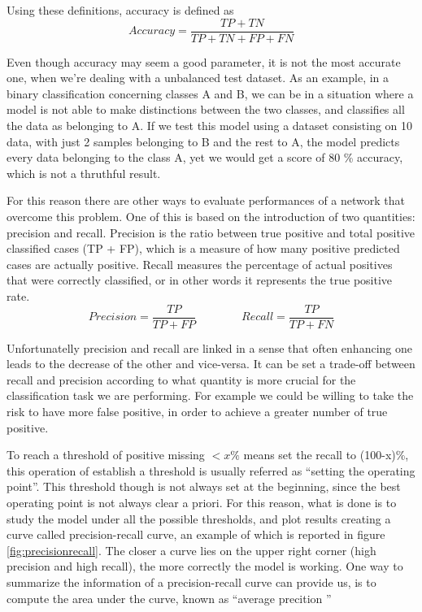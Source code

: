 \documentclass[11pt]{report}
\begin{document}
Using these definitions, accuracy is defined as
\begin{equation}
Accuracy = \frac{TP + TN}{TP+TN+FP+FN}
\end{equation}

Even though accuracy may seem a good parameter, it is not the most accurate one, when we're dealing with a unbalanced test dataset.
As an example, in a binary classification concerning classes A and B, we can be in a situation where a model is not able to make distinctions between the two classes, and classifies all the data as belonging to A.
If we test this model using a dataset consisting on 10 data, with just 2 samples belonging to B and the rest to A, the model predicts every data belonging to the class A, yet we would get a score of 80 \% accuracy, which is not a thruthful result.

For this reason there are other ways to evaluate performances of a network that overcome this problem.
One of this is based on the introduction of two quantities: precision and recall.
Precision is the ratio between true positive and total positive classified cases (TP + FP), which is a measure of how many positive predicted cases are actually positive.
Recall measures the percentage of actual positives that were correctly classified, or in other words it represents the true positive rate.
\begin{equation}
Precision = \frac{TP}{TP+FP} \qquad \qquad Recall = \frac{TP}{TP+FN}
\end{equation}

Unfortunatelly precision and recall are linked in a sense that often enhancing one leads to the decrease of the other and vice-versa.
It can be set a trade-off between recall and precision according to what quantity is more crucial for the classification task we are performing.
For example we could be willing to take the risk to have more false positive, in order to achieve a greater number of true positive.

To reach a threshold of positive missing $<x\%$ means set the recall to (100-x)\%, this operation of establish a threshold is usually referred as \textquotedblleft setting the operating point\textquotedblright.
This threshold though is not always set at the beginning, since the best operating point is not always clear a priori.
For this reason, what is done is to study the model under all the possible thresholds, and plot results creating a curve called precision-recall curve, an example of which is reported in figure \ref{fig:precisionrecall}.
The closer a curve lies on the upper right corner (high precision and high recall), the more correctly the model is working.
One way to summarize the information of a precision-recall curve can provide us, is to compute the area under the curve, known as \textquotedblleft average precition \textquotedblright
\end{document}
